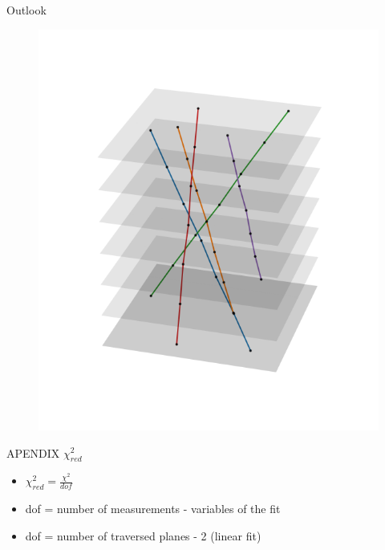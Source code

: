 \documentclass{beamer}
\begin{document}
\begin{frame}{Outlook}
\begin{minipage}{.55\textwidth}
	\begin{figure}[H]
	    \centering
	    \includegraphics[width=\textwidth]{outlook.png}
	\end{figure}
    \end{minipage}
\end{frame}
\begin{frame}{APENDIX}
  \LARGE $\chi^2_{red}$ \normalsize \\[.5cm]
  \begin{itemize}
    \item $\chi^2_{red}=\frac{\chi^2}{dof}$
    \item dof = number of measurements - variables of the fit
    \item dof = number of traversed planes - 2 (linear fit)
  \end{itemize}
\end{frame}
\end{document}
